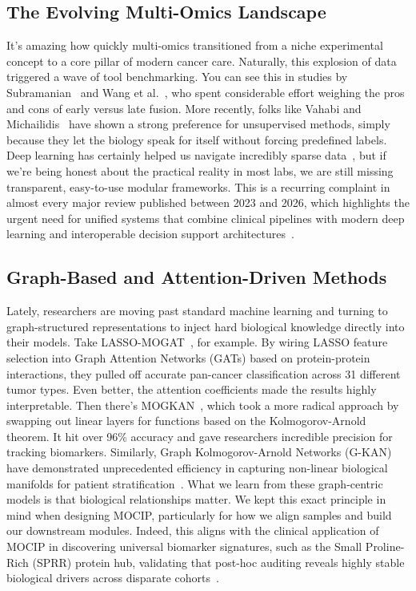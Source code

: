 \documentclass[12pt,a4paper,onecolumn]{article}
\begin{document}
\subsection{The Evolving Multi-Omics Landscape}
It's amazing how quickly multi-omics transitioned from a niche experimental concept to a core pillar of modern cancer care. Naturally, this explosion of data triggered a wave of tool benchmarking. You can see this in studies by Subramanian~\cite{subramanian2020} and Wang et al.~\cite{wang2021evaluation}, who spent considerable effort weighing the pros and cons of early versus late fusion. More recently, folks like Vahabi and Michailidis~\cite{vahabi2022unsupervised} have shown a strong preference for unsupervised methods, simply because they let the biology speak for itself without forcing predefined labels. Deep learning has certainly helped us navigate incredibly sparse data~\cite{kang2022roadmap}, but if we're being honest about the practical reality in most labs, we are still missing transparent, easy-to-use modular frameworks. This is a recurring complaint in almost every major review published between 2023 and 2026, which highlights the urgent need for unified systems that combine clinical pipelines with modern deep learning and interoperable decision support architectures~\cite{wekesa2023review,abdelaziz2024multi,muneer2025review,chen2025multimodal}.

\subsection{Graph-Based and Attention-Driven Methods}
Lately, researchers are moving past standard machine learning and turning to graph-structured representations to inject hard biological knowledge directly into their models. Take LASSO-MOGAT~\cite{alharbi2024lassomogat}, for example. By wiring LASSO feature selection into Graph Attention Networks (GATs) based on protein-protein interactions, they pulled off accurate pan-cancer classification across 31 different tumor types. Even better, the attention coefficients made the results highly interpretable. Then there's MOGKAN~\cite{alharbi2025mogkan}, which took a more radical approach by swapping out linear layers for functions based on the Kolmogorov-Arnold theorem. It hit over 96\% accuracy and gave researchers incredible precision for tracking biomarkers. Similarly, Graph Kolmogorov-Arnold Networks (G-KAN) have demonstrated unprecedented efficiency in capturing non-linear biological manifolds for patient stratification~\cite{zheng2025graph}. What we learn from these graph-centric models is that biological relationships matter. We kept this exact principle in mind when designing MOCIP, particularly for how we align samples and build our downstream modules. Indeed, this aligns with the clinical application of MOCIP in discovering universal biomarker signatures, such as the Small Proline-Rich (SPRR) protein hub, validating that post-hoc auditing reveals highly stable biological drivers across disparate cohorts~\cite{zitouni2026universal}.
\end{document}

